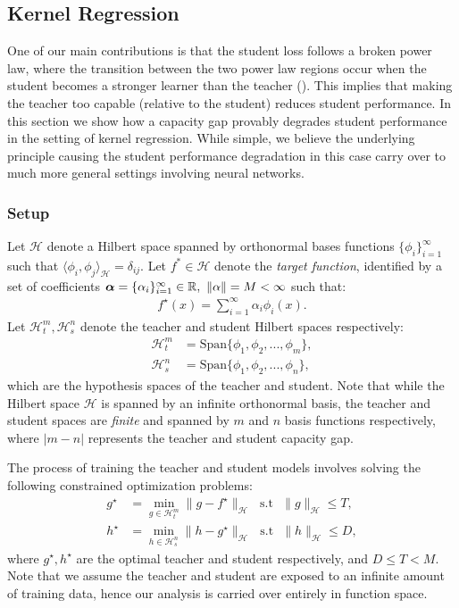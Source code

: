 \subsection{Kernel Regression}
\label{ssec:kernel-regression}
One of our main contributions is that the student loss follows a broken power law, where the transition between the two power law regions 
occur when the student becomes a stronger learner than the
teacher (). 
This implies that making the teacher too capable (relative to the student)
reduces student performance.
In this section we show how a capacity gap provably degrades student performance in the setting of kernel regression. 
While simple, we believe the underlying principle causing the student performance degradation in this case carry over to much more general settings involving neural networks.
\subsubsection{Setup}
\label{sssec:setup}
Let $\mathcal{H}$ denote a Hilbert space spanned by orthonormal bases functions 
$\{\phi_i\}_{i=1}^\infty$ 
such that $\langle \phi_i,\phi_j \rangle_{\mathcal{H}} = \delta_{ij}$. 
Let $f^* \in \mathcal{H}$ denote the \emph{target function}, identified by a set of coefficients $\bm{\alpha} = \{\alpha_i\}_{i=1}^\infty \in \mathbb{R},~\|\alpha\| = M<\infty$ such that:
\begin{align}
	f^\star(x) = \sum_{i=1}^\infty \alpha_i\phi_i(x).
\end{align}
Let $\mathcal{H}_t^m,\mathcal{H}_s^n$ denote the teacher and student Hilbert spaces respectively:
\begin{align}
	\mathcal{H}_t^m & = \text{Span}\{\phi_1,\phi_2,...,\phi_m\}, \\
	\mathcal{H}_s^n & = \text{Span}\{\phi_1,\phi_2,...,\phi_n\},
\end{align}
which are the hypothesis spaces of the teacher and student.
Note that while the Hilbert space $\mathcal{H}$ is spanned by an infinite orthonormal basis, the teacher and student spaces are \emph{finite} and spanned by $m$ and $n$ basis functions respectively, where $|m-n|$ represents the teacher and student capacity gap. 

The process of training the teacher and student models involves solving the following constrained optimization problems:
\begin{align}
	g^\star & = \min_{g \in \mathcal{H}_t^m}\|g - f^\star\|_\mathcal{H} ~~~\text{s.t}~~~ \|g\|_\mathcal{H} \leq T, \\
	h^\star & = \min_{h \in \mathcal{H}_s^n}\|h - g^\star\|_\mathcal{H} ~~~\text{s.t}~~~ \|h\|_\mathcal{H} \leq D,
\end{align}
where $g^\star, h^\star$ are the optimal teacher and student respectively, and $D\leq T<M$. Note that we assume the teacher and student are exposed to an infinite amount of training data, hence our analysis is carried over entirely in function space.


